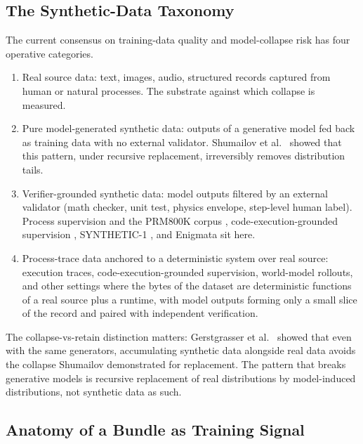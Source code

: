 \documentclass[10pt,twocolumn,letterpaper]{article}
\begin{document}
\subsection{The Synthetic-Data Taxonomy}

The current consensus on training-data quality and model-collapse
risk has four operative categories.
\begin{enumerate}[leftmargin=1.2em]
\item Real source data: text, images, audio, structured records
      captured from human or natural processes. The substrate
      against which collapse is measured.
\item Pure model-generated synthetic data: outputs of a generative
      model fed back as training data with no external validator.
      Shumailov et al.\
      \cite{shumailov2023curse,shumailov2024nature} showed that
      this pattern, under recursive replacement, irreversibly
      removes distribution tails.
\item Verifier-grounded synthetic data: model outputs filtered by
      an external validator (math checker, unit test, physics
      envelope, step-level human label). Process supervision and
      the PRM800K corpus \cite{lightman2023verify},
      code-execution-grounded supervision \cite{jung2025codeexec},
      SYNTHETIC-1 \cite{primeintellect2025synthetic1}, and
      Enigmata \cite{seed2025enigmata} sit here.
\item Process-trace data anchored to a deterministic system over
      real source: execution traces, code-execution-grounded
      supervision, world-model rollouts, and other settings where
      the bytes of the dataset are deterministic functions of a
      real source plus a runtime, with model outputs forming only a
      small slice of the record and paired with independent
      verification.
\end{enumerate}

The collapse-vs-retain distinction matters: Gerstgrasser et al.\
\cite{gerstgrasser2024accumulate} showed that even with the same
generators, accumulating synthetic data alongside real data avoids
the collapse Shumailov demonstrated for replacement. The pattern
that breaks generative models is recursive replacement of real
distributions by model-induced distributions, not synthetic data
as such.

\subsection{Anatomy of a Bundle as Training Signal}
\end{document}
